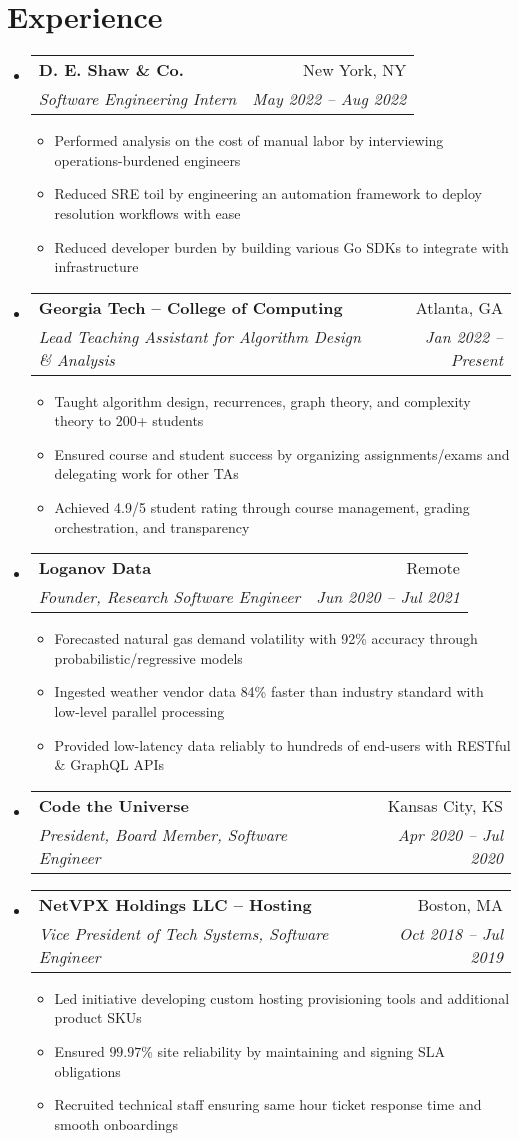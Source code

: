 \documentclass[a4paper,11pt]{extarticle}
\makeatletter
\newcommand{\resumeItem}[1]{
	\item\small{
		#1 \vspace{-2pt}
	}
}
\newcommand{\resumeSubheading}[4]{
	\vspace{-1pt}\item
		\begin{tabular*}{1\linewidth}{l@{\extracolsep{\fill}}r}
			\textbf{#1} & #2 \\
			\textit{#3} & \textit{#4} \\
		\end{tabular*}\vspace{-3pt}
}
\newcommand{\resumeSubHeadingListStart}{
    \begin{itemize}[leftmargin=0.15in,label={}]}
\newcommand{\resumeSubHeadingListEnd}{\end{itemize}}
\newcommand{\resumeItemListStart}{\begin{itemize}\vspace{-3pt}}
\newcommand{\resumeItemListEnd}{\end{itemize}\vspace{-3pt}}
\makeatother
\begin{document}
\section{Experience}
	\resumeSubHeadingListStart
        \resumeSubheading
            {D. E. Shaw \& Co.}
            {New York, NY}
            {Software Engineering Intern}
            {May 2022 -- Aug 2022}
		\resumeItemListStart
            \resumeItem{Performed analysis on the cost of manual labor by interviewing
                operations-burdened engineers}
            \resumeItem{Reduced SRE toil by engineering an automation
                framework to deploy resolution workflows with ease}
            \resumeItem{Reduced developer burden by building various Go SDKs to 
                integrate with infrastructure}
		\resumeItemListEnd
        \resumeSubheading
            {Georgia Tech -- College of Computing}
            {Atlanta, GA}
            {Lead Teaching Assistant for Algorithm Design \& Analysis}
            {Jan 2022 -- Present}
		\resumeItemListStart
			\resumeItem{Taught algorithm design, recurrences, graph
            theory, and complexity theory to 200+ students}
            \resumeItem{Ensured course and student success by organizing 
                assignments/exams and delegating work for other TAs}
            \resumeItem{Achieved 4.9/5 student rating through course management,
                grading orchestration, and transparency}
		\resumeItemListEnd
		\resumeSubheading
            {Loganov Data}
            {Remote}
		    {Founder, Research Software Engineer}
            {Jun 2020 -- Jul 2021}
		\resumeItemListStart
			\resumeItem{Forecasted natural gas demand volatility with 92\%
				accuracy through probabilistic/regressive models}
			\resumeItem{Ingested weather vendor data 84\% faster than industry
				standard with low-level parallel processing}
			\resumeItem{Provided low-latency data reliably to hundreds of
				end-users with RESTful \& GraphQL APIs}
		\resumeItemListEnd
		\resumeSubheading
            {Code the Universe}
            {Kansas City, KS}
		    {President, Board Member, Software Engineer}
            {Apr 2020 -- Jul 2020}
        \vspace{-1mm}
		\resumeSubheading
            {NetVPX Holdings LLC -- Hosting}
            {Boston, MA}
		    {Vice President of Tech Systems, Software Engineer}
            {Oct 2018 -- Jul 2019}
		\resumeItemListStart
			\resumeItem{Led initiative developing custom hosting provisioning
				tools and additional product SKUs}
			\resumeItem{Ensured $99.97$\% site reliability by maintaining
				and signing SLA obligations}
			\resumeItem{Recruited technical staff ensuring same hour ticket
				response time and smooth onboardings}
		\resumeItemListEnd
	\resumeSubHeadingListEnd
\end{document}
